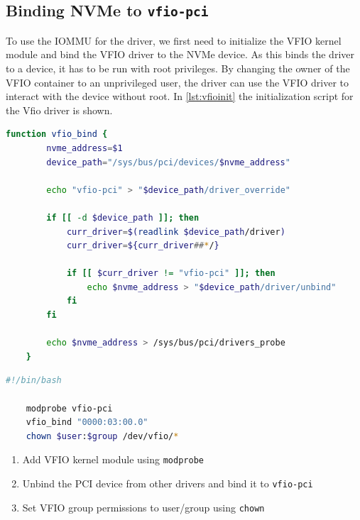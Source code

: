 \subsection{Binding NVMe to \texttt{vfio-pci}}\label{sec:bindvfiopci}
To use the IOMMU for the driver, we first need to initialize the VFIO kernel module and bind the VFIO driver to the NVMe device.
As this binds the driver to a device, it has to be run with root privileges.
By changing the owner of the VFIO container to an unprivileged user, the driver can use the VFIO driver to interact with the device without root.
In \autoref{lst:vfioinit} the initialization script for the Vfio driver is shown.

\begin{minipage}{\linewidth}
    \begin{lstlisting}[language=bash,caption={\texttt{vfio-pci} binding function in bash}, label=lst:vfiobind, frame=single]
    function vfio_bind {
        nvme_address=$1
        device_path="/sys/bus/pci/devices/$nvme_address"

        echo "vfio-pci" > "$device_path/driver_override"

        if [[ -d $device_path ]]; then
            curr_driver=$(readlink $device_path/driver)
            curr_driver=${curr_driver##*/}

            if [[ $curr_driver != "vfio-pci" ]]; then
                echo $nvme_address > "$device_path/driver/unbind"
            fi
        fi

        echo $nvme_address > /sys/bus/pci/drivers_probe
    }
\end{lstlisting}
\end{minipage}

\begin{lstlisting}[language=bash,caption={Initializing \texttt{vfio-pci} using \texttt{vfio\_bind} from \autoref{lst:vfiobind} and setting permissions}, label=lst:vfioinit, frame=single]
    #!/bin/bash
    
    modprobe vfio-pci
    vfio_bind "0000:03:00.0"
    chown $user:$group /dev/vfio/*
\end{lstlisting}

\begin{enumerate}
    \item Add VFIO kernel module using \texttt{modprobe}
    \item Unbind the PCI device from other drivers and bind it to \texttt{vfio-pci}
    \item Set VFIO group permissions to user/group using \texttt{chown}
\end{enumerate}

